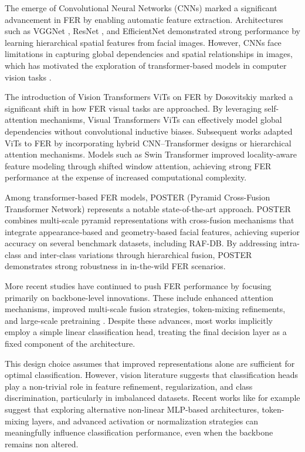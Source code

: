 The emerge of Convolutional Neural Networks (CNNs) marked a significant advancement in \gls{FER} by enabling automatic feature extraction. Architectures such as VGGNet \cite{simonyan_very_2015}, ResNet \cite{he_deep_2015}, and EfficientNet \cite{tan_efficientnet_2020} demonstrated strong performance by learning hierarchical spatial features from facial images. However, CNNs face limitations in capturing global dependencies and spatial relationships in images, which has motivated the exploration of transformer-based models in computer vision tasks \cite{islam_recent_2023}. 

The introduction of Vision Transformers \gls{ViTs} on \gls{FER} by Dosovitskiy \cite{dosovitskiy_image_2021} marked a significant shift in how \gls{FER} visual tasks are approached. By leveraging self-attention mechanisms, Visual Transformers \gls{ViTs} can effectively model global dependencies without convolutional inductive biases. Subsequent works adapted \gls{ViTs} to FER by incorporating hybrid CNN–Transformer designs or hierarchical attention mechanisms. Models such as Swin Transformer \cite{liu_swin_2021} improved locality-aware feature modeling through shifted window attention, achieving strong FER performance at the expense of increased computational complexity.


Among transformer-based \gls{FER} models, \gls{POSTER} (Pyramid Cross-Fusion Transformer Network) \cite{zheng_poster_2022} represents a notable state-of-the-art approach. \gls{POSTER} combines multi-scale pyramid representations with cross-fusion mechanisms that integrate appearance-based and geometry-based facial features, achieving superior accuracy on several benchmark datasets, including RAF-DB. By addressing intra-class and inter-class variations through hierarchical fusion, \gls{POSTER} demonstrates strong robustness in \gls{in-the-wild} \gls{FER} scenarios.

More recent studies have continued to push FER performance by focusing primarily on backbone-level innovations. These include enhanced attention mechanisms, improved multi-scale fusion strategies, token-mixing refinements, and large-scale pretraining \cite{islam_recent_2023, wang_survey_2024}. Despite these advances, most works implicitly employ a simple linear classification head, treating the final decision layer as a fixed component of the architecture.

This design choice assumes that improved representations alone are sufficient for optimal classification. However, vision literature suggests that classification heads play a non-trivial role in feature refinement, regularization, and class discrimination, particularly in imbalanced datasets. Recent works like for example \cite{tolstikhin_mlp-mixer_2021, steiner_how_2022, abdullah_activator_2024} suggest that exploring alternative non-linear MLP-based architectures, token-mixing layers, and advanced activation or normalization strategies can meaningfully influence classification performance, even when the backbone remains non altered.


